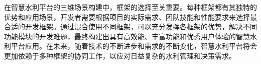 {{{在智慧水利平台的三维场景构建中，框架的选择至关重要。每种框架都有其独特的优势和应用场景，开发者需要根据项目的实际需求、团队技能和性能要求来选择最合适的开发框架。通过混合使用不同框架，可以充分发挥各框架的优势，解决不同功能模块的开发难题，最终构建出具有高效能、丰富功能和优秀用户体验的智慧水利平台应用。在未来，随着技术的不断进步和需求的不断变化，智慧水利平台将会更加依赖于多种框架的协同工作，以应对日益复杂的水利管理和决策需求。 \hypertarget{ux601dux8003ux9898ux4e0eux7ec3ux4e60}{%

}}}}
